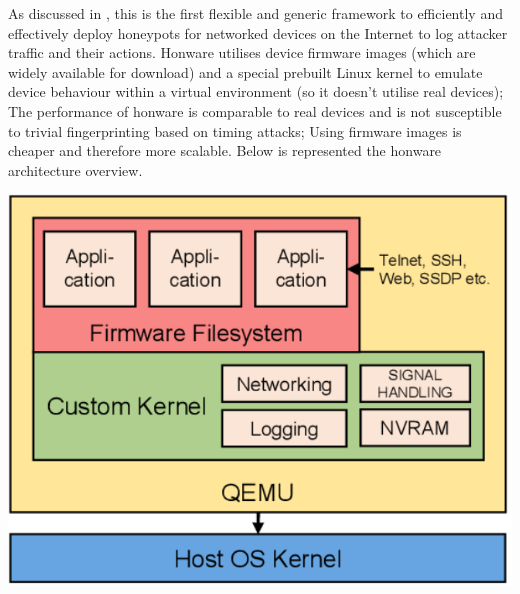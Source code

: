 \documentclass[epsfig,a4paper,11pt,titlepage,oneside,openany]{book}
\begin{document}
As discussed in \cite{Honware}, this is the first flexible and generic framework to efficiently and effectively deploy honeypots for networked devices on the Internet to log attacker traffic and their actions. 
Honware utilises device firmware images (which are widely available for download) and a special prebuilt Linux kernel to emulate device behaviour within a virtual environment (so it doesn’t utilise real devices);
The performance of honware is comparable to real devices and is not susceptible to trivial fingerprinting based on timing attacks;
Using firmware images is cheaper and therefore more scalable.
Below is represented the honware architecture overview.
\begin{center}
\includegraphics[scale=0.25]{honware}
\end{center}
\endgroup


%


\end{document}
